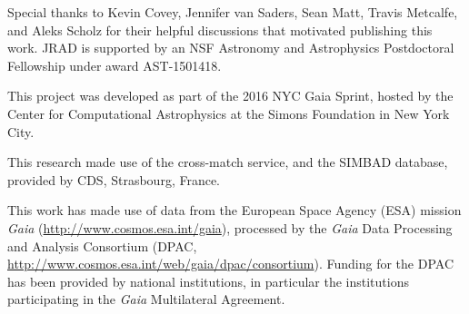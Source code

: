 \documentclass[manuscript, letterpaper]{aastex6}
\begin{document}
\acknowledgments
Special thanks to Kevin Covey, Jennifer van Saders, Sean Matt, Travis Metcalfe, and Aleks Scholz for their helpful discussions that motivated publishing this work.
JRAD is supported by an NSF Astronomy and Astrophysics Postdoctoral Fellowship under award AST-1501418. 

This project was developed as part of the 2016 NYC Gaia Sprint, hosted by the Center for Computational Astrophysics at the Simons Foundation in New York City.

This research made use of the cross-match service, and the SIMBAD database, provided by CDS, Strasbourg, France.

This work has made use of data from the European Space Agency (ESA)
mission {\it Gaia} (\url{http://www.cosmos.esa.int/gaia}), processed by
the {\it Gaia} Data Processing and Analysis Consortium (DPAC,
\url{http://www.cosmos.esa.int/web/gaia/dpac/consortium}). Funding
for the DPAC has been provided by national institutions, in particular
the institutions participating in the {\it Gaia} Multilateral Agreement.
\end{document}
